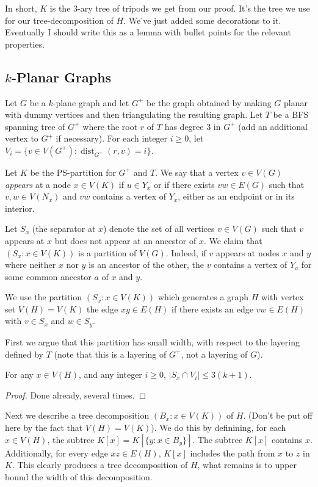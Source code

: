 \documentclass{patmorin}
\DeclareMathOperator{\dist}{dist}
\begin{document}
In short, $K$ is the 3-ary tree of tripods we get from our proof.  It's the tree we use for our tree-decomposition of $H$.  We've just added some decorations to it. Eventually I should write this as a lemma with bullet points for the relevant properties.

\subsection{$k$-Planar Graphs}

Let $G$ be a $k$-plane graph and let $G^+$ be the graph obtained by making $G$ planar with dummy vertices and then triangulating the resulting graph. Let $T$ be a BFS spanning tree of $G^+$ where the root $r$ of $T$ has degree 3 in $G^+$ (add an additional vertex to $G^+$ if necessary). For each integer $i\ge 0$, let $V_i=\{v\in V(G^+): \dist_{G^+}(r,v)=i\}$.

Let $K$ be the PS-partition for $G^+$ and $T$.  We say that a vertex $v\in V(G)$ \emph{appears} at a node $x\in V(K)$ if $u\in Y_x$ or if there exists $vw\in E(G)$ such that $v,w\in V(N_x)$ and $vw$ contains a vertex of $Y_x$, either as an endpoint or in its interior.

Let $S_x$ (the separator at $x$) denote the set of all vertices $v\in V(G)$ such that $v$ appears at $x$ but does not appear at an ancestor of $x$.  We claim that $(S_x:x\in V(K))$ is a partition of $V(G)$. Indeed, if $v$ appears at nodes $x$ and $y$ where neither $x$ nor $y$ is an ancestor of the other, the $v$ contains a vertex of $Y_a$ for some common ancestor $a$ of $x$ and $y$.

We use the partition $(S_x: x\in V(K))$ which generates a graph $H$ with vertex set $V(H)=V(K)$ the edge $xy\in E(H)$ if there exists an edge $vw\in E(H)$ with $v\in S_x$ and $w\in S_y$.

First we argue that this partition has small width, with respect to the layering defined by $T$ (note that this is a layering of $G^+$, not a layering of $G$).

\begin{clm}
  For any $x\in V(H)$, and any integer $i\ge 0$, $|S_x\cap V_i|\le 3(k+1)$.
\end{clm}

\begin{proof}
  Done already, several times.
\end{proof}

Next we describe a tree decomposition $(B_x:x\in V(K))$ of $H$.  (Don't be put off here by the fact that $V(H)=V(K)$).  We do this by definining, for each $x\in V(H)$, the subtree $K[x]=K[\{y:x\in B_y\}]$.  The subtree $K[x]$ contains $x$.  Additionally, for every edge $xz\in E(H)$, $K[x]$ includes the path from $x$ to $z$ in $K$.  This clearly produces a tree decomposition of $H$, what remains is to upper bound the width of this decomposition.
\end{document}
